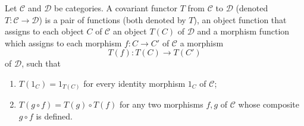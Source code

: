 Let $\mathcal{C}$ and $\mathcal{D}$ be categories. A covariant functor $T$ from $\mathcal{C}$ to $\mathcal{D}$ (denoted $T : \mathcal{C} \to \mathcal{D}$) is a pair of functions (both denoted by $T$), an object function that assigns to each object $C$ of $\mathcal{C}$ an object $T(C)$ of $\mathcal{D}$ and a morphism function which assigns to each morphism $f : C \to C'$ of $\mathcal{C}$ a morphism
\[
T(f) : T(C) \to T(C')
\]
of $\mathcal{D}$, such that
\begin{enumerate}
\item[(i)] $T(1_C) = 1_{T(C)}$ for every identity morphism $1_C$ of $\mathcal{C}$;
\item[(ii)] $T(g \circ f) = T(g) \circ T(f)$ for any two morphisms $f, g$ of $\mathcal{C}$ whose composite $g \circ f$ is defined.
\end{enumerate}
